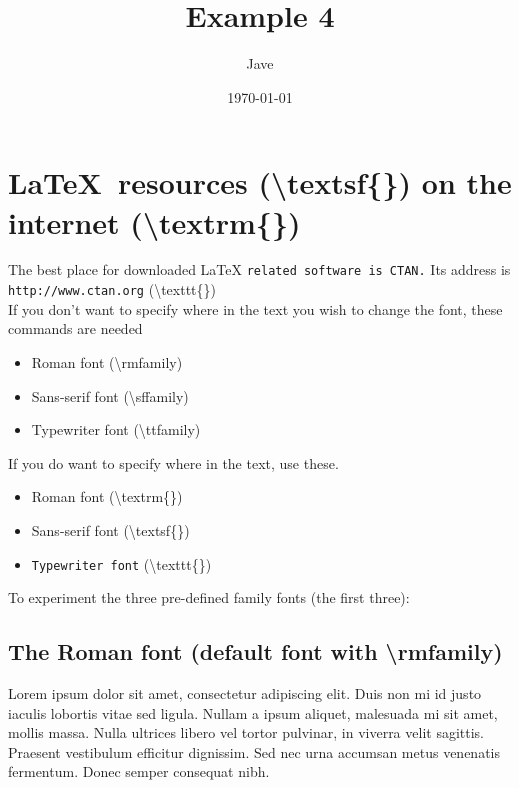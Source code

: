\documentclass[letterpaper, 12pt]{article}
\begin{document}
\newcommand{\textttEx}{\textbackslash{}texttt\{\}}
\newcommand{\textsfEx}{\textbackslash{}textsf\{\}}
\newcommand{\textrmEx}{\textbackslash{}textrm\{\}}

\newcommand{\rmfamilyEx}{\textbackslash{}rmfamily}
\newcommand{\sffamilyEx}{\textbackslash{}sffamily}
\newcommand{\ttfamilyEx}{\textbackslash{}ttfamily}


\title{Example 4}
\date{\today}
\author{Jave}
\maketitle

\section{\textsf{\LaTeX\ resources (\textsfEx) \textrm{on the internet (\textrmEx)} } }

The best place for downloaded LaTeX \texttt{related software is CTAN.}
Its address is \texttt{http://www.ctan.org} (\textttEx)\\

If you don't want to specify where in the text you wish to change the font, these commands are needed
\begin{itemize}
  \item \rmfamily Roman font (\rmfamilyEx)
  \item \sffamily Sans-serif font (\sffamilyEx)
  \item \ttfamily Typewriter font (\ttfamilyEx)
\end{itemize}

If you do want to specify where in the text, use these. 
\begin{itemize}
  \item \textrm{Roman font} (\textrmEx)
  \item \textsf{Sans-serif font} (\textsfEx)
  \item \texttt{Typewriter font} (\textttEx)
\end{itemize}

\noindent To experiment the three pre-defined family fonts (the first three):

  \subsection{The Roman font (default font with \rmfamilyEx)}
  \rmfamily
Lorem ipsum dolor sit amet, consectetur adipiscing elit. Duis non mi id justo iaculis lobortis vitae sed ligula. Nullam a ipsum aliquet, malesuada mi sit amet, mollis massa.
Nulla ultrices libero vel tortor pulvinar, in viverra velit sagittis. Praesent vestibulum efficitur dignissim. Sed nec urna accumsan metus venenatis fermentum. 
Donec semper consequat nibh. 
\end{document}
